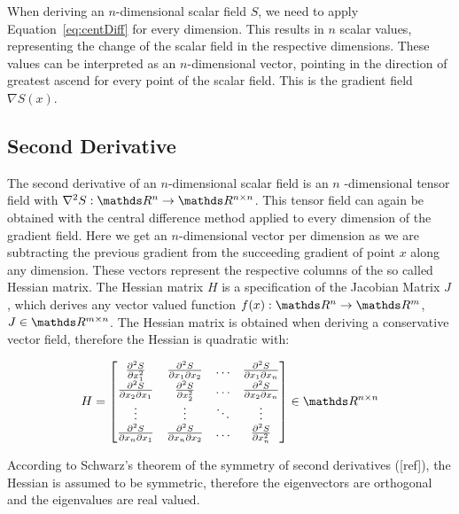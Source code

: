 When deriving an $n$-dimensional scalar field $S$, we need to apply
Equation~\ref{eq:centDiff} for every dimension. This results in $n$
scalar values, representing the change of the scalar field in the
respective dimensions. These values can be interpreted as an
$n$-dimensional vector, pointing in the direction of greatest ascend for
every point of the scalar field. This is the gradient field $\nabla
S(x)$.

\subsection{Second Derivative}

The second derivative of an $n$-dimensional scalar field is an $n$
-dimensional tensor field with $\nabla^2 S:\real^n \rightarrow \real^{n
\times n}$. This tensor field can again be obtained with the central
difference method applied to every dimension of the gradient field. Here
we get an $n$-dimensional vector per dimension as we are subtracting the
previous gradient from the succeeding gradient of point $x$ along any
dimension. These vectors represent the respective columns of the so
called Hessian matrix. The Hessian matrix $H$ is a specification of the
Jacobian Matrix $J$, which derives any vector valued function $f(x):
\real^n \rightarrow \real^m$, $J \in \real^{m \times n}$. The Hessian
matrix is obtained when deriving a conservative vector field, therefore
the Hessian is quadratic with:

\begin{equation}
  H =
  \begin{bmatrix}
    \frac{\partial^2 S}{\partial x_1^2} & \frac{\partial^2 S}{\partial x_1 \partial x_2} & \dots & \frac{\partial^2 S}{\partial x_1 \partial x_n}\\
    \frac{\partial^2 S}{\partial x_2 \partial x_1} & \frac{\partial^2 S}{\partial x_2^2} & \dots & \frac{\partial^2 S}{\partial x_2 \partial x_n}\\
    \vdots & \vdots & \ddots & \vdots \\
    \frac{\partial^2 S}{\partial x_n \partial x_1} & \frac{\partial^2 S}{\partial x_n \partial x_2} & \dots & \frac{\partial^2 S}{\partial x_n^2}
  \end{bmatrix}
  \in \real^{n \times n}
\end{equation}

\noindent According to Schwarz's theorem of the symmetry of second
derivatives ([ref]), the Hessian is assumed to be symmetric, therefore
the eigenvectors are orthogonal and the eigenvalues are real valued.

